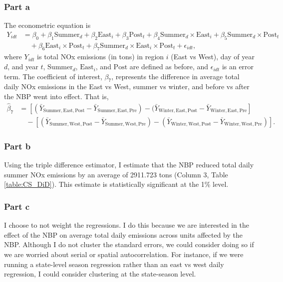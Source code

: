 \documentclass[12pt]{article}
\begin{document}
\subsubsection*{Part a}
The econometric equation is
\begin{align}
	Y_{idt} &= \beta_0 + \beta_1 \text{Summer}_d + \beta_2 \text{East}_i + \beta_3 \text{Post}_t + \beta_4  \text{Summer}_d \times \text{East}_i + \beta_5 \text{Summer}_d \times \text{Post}_t  \nonumber \\
	& \quad  + \beta_6 \text{East}_i \times \text{Post}_t + \beta_7 \text{Summer}_d \times  \text{East}_i \times  \text{Post}_t + \epsilon_{idt},
\end{align}
where $Y_{idt}$ is total NOx emissions (in tons) in region $i$ (East vs West), day of year $d$, and year $t$, $\text{Summer}_d$, $\text{East}_i$, and  $\text{Post}$ are defined as before, and $\epsilon_{idt}$ is an error term. The coefficient of interest, $\beta_7$, represents the difference in average total daily NOx emissions in the East vs West, summer vs winter, and before vs after the NBP went into effect. That is,
\begin{align*}
	\hat{\beta}_7 &= [(\bar{Y}_{\text{Summer}, \text{East}, \text{Post}} -  \bar{Y}_{\text{Summer}, \text{East}, \text{Pre}}) - (\bar{Y}_{\text{Winter}, \text{East}, \text{Post}} - \bar{Y}_{\text{Winter}, \text{East}, \text{Pre}}] \\
	& \quad  - [(\bar{Y}_{\text{Summer}, \text{West}, \text{Post}} -  \bar{Y}_{\text{Summer}, \text{West}, \text{Pre}}) - (\bar{Y}_{\text{Winter}, \text{West}, \text{Post}} - \bar{Y}_{\text{Winter}, \text{West}, \text{Pre}})].
\end{align*}

\subsubsection*{Part b}
Using the triple difference estimator, I estimate that the NBP reduced total daily summer NOx emissions by an average of 2911.723 tons (Column 3, Table \ref{table:CS_DiD}). This estimate is statistically significant at the 1\% level.

\subsubsection*{Part c}
I choose to not weight the regressions. I do this because we are interested in the effect of the NBP on average total daily emissions across units affected by the NBP. Although I do not cluster the standard errors, we could consider doing so if we are worried about serial or spatial autocorrelation. For instance, if we were running a state-level season regression rather than an east vs west daily regression, I could consider clustering at the state-season level.
\end{document}
